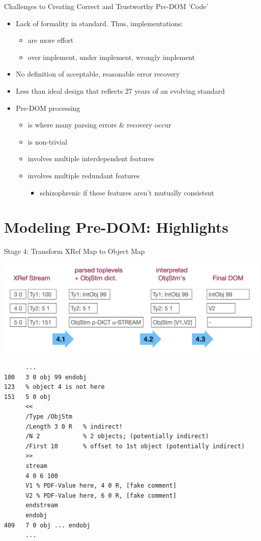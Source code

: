 \documentclass[t,10pt,xcolor={dvipsnames}]{beamer}
\begin{document}
\begin{frame}[label={sec:org9723a3d}]{Challenges to Creating Correct and Trustworthy Pre-DOM 'Code'}
\begin{itemize}
\item Lack of formality in standard. Thus, implementations:
\begin{itemize}
\item are more effort
\item over implement, under implement, wrongly implement
\end{itemize}
\item No definition of acceptable, reasonable error recovery
\item Less than ideal design that reflects 27 years of an evolving standard
\item Pre-DOM processing
\begin{itemize}
\item is where many parsing errors \& recovery occur
\item is non-trivial
\item involves multiple interdependent features
\item involves multiple redundant features
\begin{itemize}
\item schizophrenic if these features aren't mutually consistent
\end{itemize}
\end{itemize}
\end{itemize}
\end{frame}

\section{Modeling Pre-DOM: Highlights}
\label{sec:org61ad029}
\begin{frame}[label={sec:orge14246b},fragile]{Stage 4: Transform XRef Map to Object Map}
 \begin{center}
\includegraphics[width=0.8\linewidth]{images/diagram1/cropped-diagram1.001.png}
\end{center}
\lstset{language=bash,label= ,caption= ,captionpos=b,numbers=none}
\begin{lstlisting}
      ...
100   3 0 obj 99 endobj
123   % object 4 is not here
151   5 0 obj
      <<
      /Type /ObjStm
      /Length 3 0 R   % indirect!
      /N 2            % 2 objects; (potentially indirect)
      /First 10       % offset to 1st object (potentially indirect)
      >>
      stream
      4 0 6 100
      V1 % PDF-Value here, 4 0 R, [fake comment] 
      V2 % PDF-Value here, 6 0 R, [fake comment]
      endstream
      endobj
409   7 0 obj ... endobj
      ...
\end{lstlisting}
\end{frame}
\end{document}

